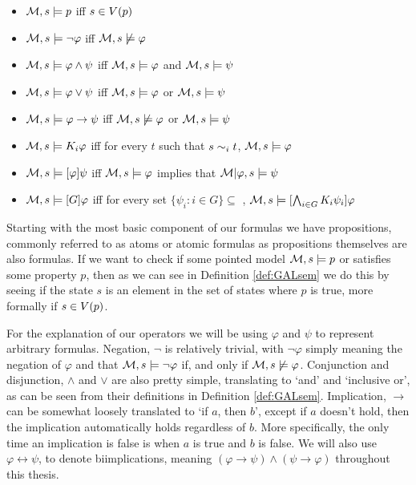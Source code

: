 \begin{definition} \hfill
	\label{def:GALsem}
	\begin{itemize}
		\item[] $\mathcal{M},s \models p $ iff $ s \in V(p)$
		\item[] $\mathcal{M},s \models \neg\varphi$ iff $ \mathcal{M},s \not\models \varphi$
		\item[] $\mathcal{M},s \models \varphi \wedge \psi $ iff $ \mathcal{M},s \models \varphi $ and $ \mathcal{M},s \models \psi$
		\item[] $\mathcal{M},s \models \varphi \vee \psi $ iff $ \mathcal{M},s \models \varphi $ or $ \mathcal{M},s \models \psi$
		\item[] $\mathcal{M},s \models \varphi \rightarrow \psi $ iff $ \mathcal{M},s \not\models \varphi $ or $ \mathcal{M},s \models \psi$
		\item[] $\mathcal{M},s \models K_i\varphi $ iff for every $t$ such that $s\sim_{i}t$, $\mathcal{M},s \models \varphi$
		\item[] $\mathcal{M},s \models [\varphi]\psi $ iff $ \mathcal{M},s \models \varphi $ implies that $ \mathcal{M}|\varphi,s \models \psi$
		\item[] $\mathcal{M},s \models [G]\varphi $ iff for every set $\{\psi_i: i \in G\} \subseteq $ , $ \mathcal{M},s \models [\bigwedge_{i\in G}K_i\psi_i]\varphi$ 
	\end{itemize}
\end{definition}


Starting with the most basic component of our formulas we have propositions, commonly referred to as atoms or atomic formulas as propositions themselves are also formulas. If we want to check if some pointed model $\mathcal{M},s \models p$ or satisfies some property $p$, then as we can see in Definition \ref{def:GALsem} we do this by seeing if the state $s$ is an element in the set of states where $p$ is true, more formally if $s \in V(p)$. 

For the explanation of our operators we will be using $\varphi$ and $\psi$ to represent arbitrary formulas. Negation, $\neg$ is relatively trivial, with $\neg\varphi$ simply meaning the negation of $\varphi$ and that $\mathcal{M},s \models \neg\varphi$ if, and only if $\mathcal{M},s \not\models\varphi$. Conjunction and disjunction, $\wedge$ and $\vee$ are also pretty simple, translating to `and' and `inclusive or', as can be seen from their definitions in Definition \ref{def:GALsem}. Implication, $\rightarrow$ can be somewhat loosely translated to `if $a$, then $b$', except if $a$ doesn't hold, then the implication automatically holds regardless of $b$. More specifically, the only time an implication is false is when $a$ is true and $b$ is false. We will also use $\varphi \leftrightarrow \psi$, to denote biimplications, meaning $(\varphi \rightarrow \psi) \wedge (\psi \rightarrow \varphi)$ throughout this thesis. 

